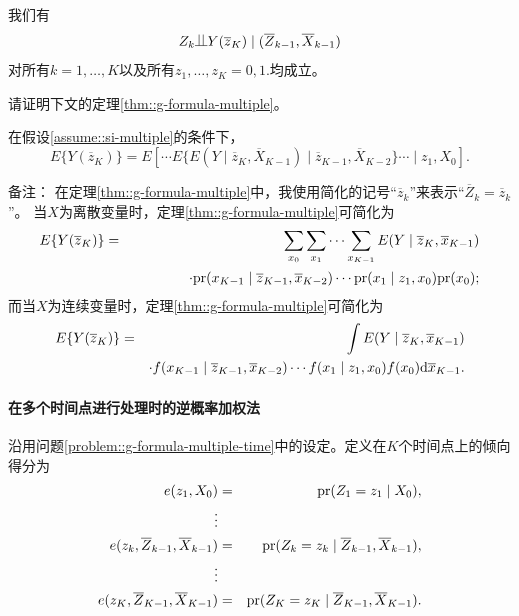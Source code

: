 \begin{assumption}
[序贯可忽略性在多个时间点上的表现]\label{assume::si-multiple}
我们有
$$
Z_k \ind Y(\overline{z}_K) \mid (\overline{Z}_{k-1}, \overline{X}_{k-1})
$$
对所有$k=1,\ldots, K$以及所有$z_1,\ldots, z_K = 0,1.$均成立。
\end{assumption}


请证明下文的定理\ref{thm::g-formula-multiple}。 


\begin{theorem}
[多时间点的g公式]
\label{thm::g-formula-multiple}
在假设\ref{assume::si-multiple}的条件下，
$$
E\{ Y(\overline{z}_K)  \} = E\left[ \cdots    
E\{   E(Y\mid \overline{z}_K, \overline{X}_{K-1}) \mid \overline{z}_{K-1}, \overline{X}_{K-2} \}
\cdots \mid z_1,  X_0 \right] .
$$
\end{theorem}


备注：  
在定理\ref{thm::g-formula-multiple}中，我使用简化的记号“$\overline{z}_k$”来表示“$\overline{Z}_k = \overline{z}_k $”。  
当$X$为离散变量时，定理\ref{thm::g-formula-multiple}可简化为  
\begin{eqnarray*}
 E\{ Y(\overline{z}_K)  \}  
&=& 
\sum_{x_0} \sum_{x_1} \cdots   \sum_{x_{K-1}} 
 E(Y\mid \overline{z}_K, \overline{x}_{K-1})   \\
 && 
\qquad \qquad \cdot  \textup{pr}(x_{K-1}\mid \overline{z}_{K-1}, \overline{x}_{K-2}) 
 \cdots
 \textup{pr}(x_1\mid z_{1}, x_0)
 \textup{pr}(x_0) ; 
\end{eqnarray*}  
而当$X$为连续变量时，定理\ref{thm::g-formula-multiple}可简化为  
\begin{eqnarray*}
  E\{ Y(\overline{z}_K)  \}  
&=& 
\int 
 E(Y\mid \overline{z}_K, \overline{x}_{K-1})   \\
 && \cdot 
 f(x_{K-1}\mid \overline{z}_{K-1}, \overline{x}_{K-2}) 
 \cdots
 f(x_1\mid z_{1}, x_0)
 f(x_0)
 \textnormal{d} \overline{x}_{K-1}   . 
\end{eqnarray*} 





 
 \paragraph{在多个时间点进行处理时的逆概率加权法}\label{problem::ipw-multiple-time}

沿用问题\ref{problem::g-formula-multiple-time}中的设定。定义在$K$个时间点上的倾向得分为\begin{eqnarray*}
e(z_1, X_0) &=& \textup{pr}(Z_1 = z_1\mid X_0) ,\\
\vdots \\
e(z_k, \overline{Z}_{k-1},  \overline{X}_{k-1}) &=&  \textup{pr}(Z_k = z_k \mid \overline{Z}_{k-1},  \overline{X}_{k-1}) ,\\
\vdots \\
e(z_K, \overline{Z}_{K-1},  \overline{X}_{K-1}) &=&  \textup{pr}(Z_K = z_K \mid \overline{Z}_{K-1},  \overline{X}_{K-1}) .
\end{eqnarray*}


